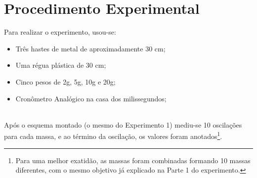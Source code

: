 \documentclass[11pt, article]{abntex2}
\begin{document}
\section{Procedimento Experimental}
Para realizar o experimento, usou-se: 
\begin{itemize}
    \item Três hastes de metal de aproximadamente 30 cm;
    \item Uma régua plástica de 30 cm;
    \item Cinco pesos de 2g, 5g, 10g e 20g; 
    \item Cronômetro Analógico na casa dos milissegundos;
\end{itemize}
\\

Após o esquema montado (o mesmo do Experimento 1) mediu-se 10 oscilações para cada massa, e ao término da oscilação, os valores foram anotados\footnote{Para uma melhor exatidão, as massas foram combinadas formando 10 massas diferentes, com o mesmo objetivo já explicado na Parte 1 do experimento.}. \\
\end{document}
